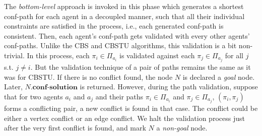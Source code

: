 \documentclass{article}
\begin{document}
\vspace{0.05in}
\noindent {} 
The \emph{bottom-level} approach is invoked in this phase which generates a shortest conf-path for each agent in a decoupled manner, such that all their individual constraints are satisfied in the process, i.e., each generated conf-path is consistent. 
Then, each agent's conf-path gets validated with every other agents' conf-paths. Unlike the CBS and CBSTU algorithms, this validation is a bit non-trivial. 
In this process, each $\pi_{i} \in \Pi_{a_i}$ is validated against each $\pi_{j} \in \Pi_{a_j}$ for all $j$ s.t. $j \neq i$. But the validation technique of a pair of paths remains the same as it was for CBSTU. If there is no conflict found, the node $N$ is declared a \emph{goal} node. Later, $N\textbf{.conf-solution}$ is returned. 
However, during the path validation, suppose that for two agents $a_i$ and $a_j$ and their paths $\pi_{i} \in \Pi_{a_i}$ and $\pi_{j} \in \Pi_{a_j}$, $(\pi_i,\pi_j)$ forms a conflicting pair, a new conflict is found in that case. 
The conflict could be either a vertex conflict or an edge conflict. 
We halt the validation process just after the very first conflict is found, and mark $N$ a \emph{non-goal} node.
\end{document}
